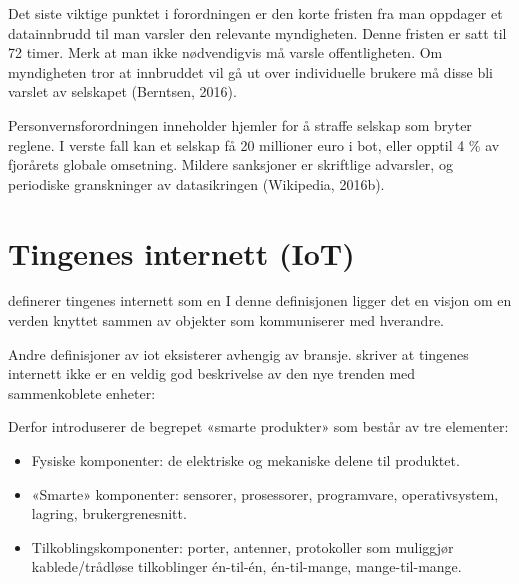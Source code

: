Det siste viktige punktet i forordningen er den korte fristen fra man oppdager
et datainnbrudd til man varsler den relevante myndigheten. Denne fristen er
satt til 72 timer. Merk at man ikke nødvendigvis må varsle offentligheten. Om
myndigheten tror at innbruddet vil gå ut over individuelle brukere må disse
bli varslet av selskapet (Berntsen, 2016).

Personvernsforordningen inneholder hjemler for å straffe selskap som bryter reglene.
I verste fall kan et selskap få 20 millioner euro i
bot, eller opptil 4 \% av fjorårets globale omsetning.
Mildere sanksjoner er skriftlige advarsler, og periodiske
granskninger av datasikringen (Wikipedia, 2016b).


\section{Tingenes internett (IoT)}
\citet{iot_legal} definerer tingenes internett som en
 I denne definisjonen ligger det en
visjon om en verden knyttet sammen av objekter som kommuniserer med hverandre.

Andre definisjoner av \gls{iot} eksisterer avhengig av bransje. \citet{iot_harvard_smart} skriver
at tingenes internett ikke er en veldig god beskrivelse av den nye trenden med
sammenkoblete enheter: 

Derfor introduserer de begrepet «smarte produkter» som består av tre elementer:

 \begin{itemize}
    \item Fysiske komponenter: de elektriske og mekaniske delene til produktet.
    \item «Smarte» komponenter: sensorer, prosessorer, programvare, operativsystem, lagring, brukergrenesnitt.
    \item Tilkoblingskomponenter: porter, antenner, protokoller som muliggjør kablede/trådløse tilkoblinger
    én-til-én, én-til-mange, mange-til-mange.
\end{itemize}

